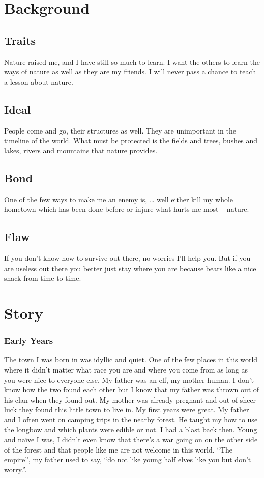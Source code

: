 \documentclass[letterpaper,10pt,twoside,twocolumn,openany]{book}
\begin{document}
	\vfill\null

	\section{Background}
		\subsection{Traits}
		Nature raised me, and I have still so much to learn. I want the others to learn the ways of nature as well as they are my friends. I will never pass a chance to teach a lesson about nature. 
		\subsection{Ideal}
		People come and go, their structures as well. They are unimportant in the timeline of the world. What must be protected is the fields and trees, bushes and lakes, rivers and mountains that nature provides. 
		\subsection{Bond}
		One of the few ways to make me an enemy is, … well either kill my whole hometown which has been done before or injure what hurts me most – nature. 
		\subsection{Flaw}
		If you don’t know how to survive out there, no worries I’ll help you. But if you are useless out there you better just stay where you are because bears like a nice snack from time to time. 

	\pagebreak
	
	\section{Story}
	\subsubsection{Early Years}
	The town I was born in was idyllic and quiet. One of the few places in this world where it didn’t matter what race you are and where you come from as long as you were nice to everyone else. My father was an elf, my mother human. I don’t know how the two found each other but I know that my father was thrown out of his clan when they found out. My mother was already pregnant and out of sheer luck they found this little town to live in. My first years were great. My father and I often went on camping trips in the nearby forest. He taught my how to use the longbow and which plants were edible or not. I had a blast back then. Young and naïve I was, I didn’t even know that there’s a war going on on the other side of the forest and that people like me are not welcome in this world. “The empire”, my father used to say, “do not like young half elves like you but don’t worry.”. 
	
\end{document}
